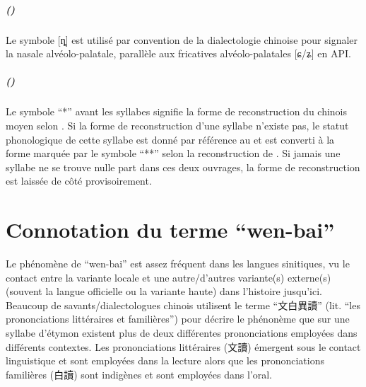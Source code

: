 \documentclass{scrbook}
\newcounter{c}[subsubsection]
\newcommand{\stpc}[1]{\stepcounter{#1}}
\newcommand{\difwenbai}{couches archaïque et récente\xspace}
\begin{document}
\begin{sloppypar}
\stpc{c}\paragraph{()}
Le symbole [ȵ] est utilisé par convention de la dialectologie chinoise pour signaler la nasale alvéolo-palatale, parallèle aux fricatives alvéolo-palatales [ɕ/ʑ] en API.

\stpc{c}\paragraph{()}
Le symbole ``*'' avant les syllabes signifie la forme de reconstruction du chinois moyen selon \textcite{Baxter1992handbook}. Si la forme de reconstruction d'une syllabe n'existe pas, le statut phonologique de cette syllabe est donné par référence au  et est converti à la forme marquée par le symbole ``**'' selon la reconstruction de \textcite{Baxter1992handbook}. Si jamais une syllabe ne se trouve nulle part dans ces deux ouvrages, la forme de reconstruction est laissée de côté provisoirement.

\chapter{Connotation du terme ``wen-bai''}\label{wenbai}
Le phénomène de ``wen-bai'' est assez fréquent dans les langues sinitiques, vu le contact entre la variante locale et une autre/d'autres variante(s) externe(s) (souvent la langue officielle ou la variante haute) dans l'histoire jusqu'ici. Beaucoup de savants/dialectologues chinois utilisent le terme ``文白異讀'' (lit. ``les prononciations littéraires et familières'') pour décrire le phénonème que sur une syllabe d'étymon existent plus de deux différentes prononciations employées dans différents contextes. Les prononciations littéraires (文讀) émergent sous le contact linguistique et sont employées dans la lecture alors que les prononciations familières (白讀) sont indigènes et sont employées dans l'oral. 


\end{sloppypar}
\end{document}
